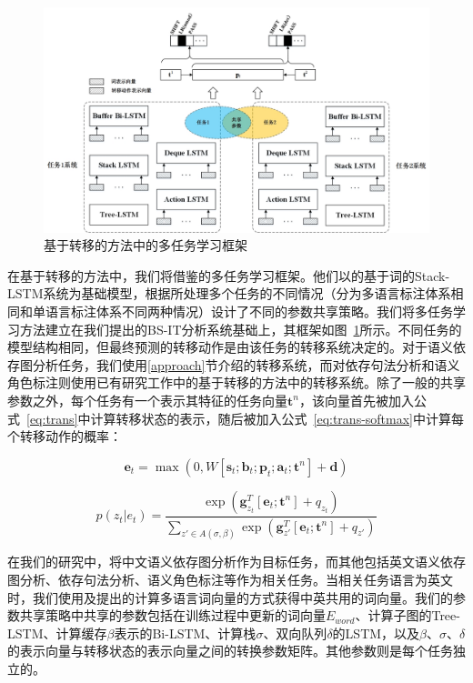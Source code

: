 \begin{figure}[hbtp]
	\centering
	\includegraphics[width=120mm]{picture/mtl.jpg}
	\caption{基于转移的方法中的多任务学习框架}
	\label{fig:mtl}
\end{figure}

在基于转移的方法中，我们将借鉴的多任务学习框架。他们以的基于词的Stack-LSTM系统为基础模型，根据所处理多个任务的不同情况（分为多语言标注体系相同和单语言标注体系不同两种情况）设计了不同的参数共享策略。我们将多任务学习方法建立在我们提出的BS-IT分析系统基础上，其框架如图~\ref{fig:mtl}所示。不同任务的模型结构相同，但最终预测的转移动作是由该任务的转移系统决定的。对于语义依存图分析任务，我们使用\ref{approach}节介绍的转移系统，而对依存句法分析和语义角色标注则使用已有研究工作中的基于转移的方法中的转移系统。除了一般的共享参数之外，每个任务有一个表示其特征的任务向量$\mathbf{t}^n$，该向量首先被加入公式~\ref{eq:trans}中计算转移状态的表示，随后被加入公式~\ref{eq:trans-softmax}中计算每个转移动作的概率：

\begin{equation}
\mathbf{e}_t=\max(0,W[\mathbf{s}_t;\mathbf{b}_t; \mathbf{p}_t; \mathbf{a}_t;\mathbf{t}^n ]+\mathbf{d})
\end{equation}

\begin{equation}
p(z_t|e_t)=\frac{\exp(\mathbf{g}^T_{z_t}[\mathbf{e}_t;\mathbf{t}^n] + q_{z_t})}{\sum_{z'\in A(\sigma, \beta)}\exp (\mathbf{g}^T_{z'}[\mathbf{e}_t;\mathbf{t}^n]+q_{z'})}
\end{equation}

在我们的研究中，将中文语义依存图分析作为目标任务，而其他包括英文语义依存图分析、依存句法分析、语义角色标注等作为相关任务。当相关任务语言为英文时，我们使用及提出的计算多语言词向量的方式获得中英共用的词向量。我们的参数共享策略中共享的参数包括在训练过程中更新的词向量$E_{word}$、计算子图的Tree-LSTM、计算缓存$\beta$表示的Bi-LSTM、计算栈$\sigma$、双向队列$\delta$的LSTM，以及$\beta$、$\sigma$、$\delta$的表示向量与转移状态的表示向量之间的转换参数矩阵。其他参数则是每个任务独立的。

